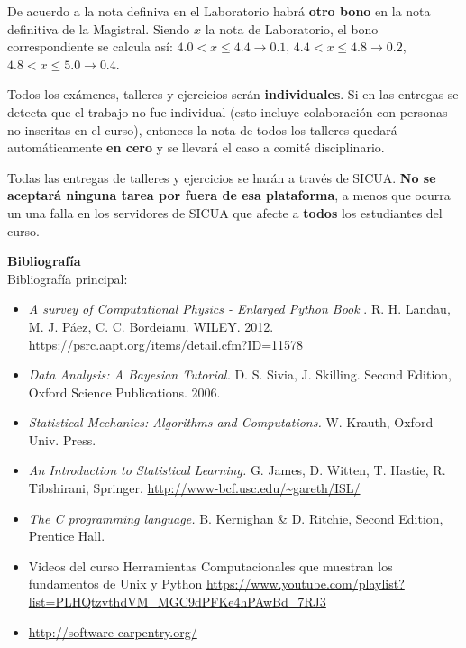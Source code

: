 \documentclass[letterpaper,10pt,onecolumn]{article}
\begin{document}
De acuerdo a la nota definiva en el Laboratorio habr\'a {\bf otro bono} en la
nota definitiva de la Magistral. 
Siendo $x$ la nota de Laboratorio, el bono correspondiente
se calcula as\'i:
$4.0 < x \leq 4.4 \rightarrow 0.1$, $4.4< x\leq 4.8\rightarrow 0.2$, $4.8<x
\leq 5.0\rightarrow 0.4$.

Todos los ex\'amenes, talleres y ejercicios ser\'an
\textbf{individuales}.  
Si en las entregas se detecta que el trabajo no fue
individual (esto incluye colaboraci\'on con personas no inscritas en
el curso), entonces la nota de todos los talleres quedar\'a
autom\'aticamente {\bf en cero} y se llevar\'a el caso a comit\'e
disciplinario. 

Todas las entregas de talleres y ejercicios se har\'an a trav\'es de
SICUA.  {\bf No se aceptar\'a ninguna tarea por fuera de esa
  plataforma}, a menos que ocurra un una falla en los servidores de
SICUA que afecte a {\bf todos} los estudiantes del curso.



\noindent\textbf{\large {} \quad
  Bibliograf\'ia}\\[-0.2cm] 



\noindent\normalsize Bibliograf\'ia principal:

\begin{itemize}
\item
\textit{A survey of Computational Physics - Enlarged Python Book}
. R. H. Landau, M. J. P\'aez, C. C. Bordeianu. WILEY. 2012.
\url{https://psrc.aapt.org/items/detail.cfm?ID=11578}

\item
\textit{Data Analysis: A Bayesian Tutorial.} D. S. Sivia,
J. Skilling. Second Edition, Oxford Science Publications. 2006.

\item 
\textit{Statistical Mechanics: Algorithms and Computations.}
W. Krauth, Oxford Univ. Press. 

\item
\textit{An Introduction to Statistical Learning.} G. James, D. Witten,
T. Hastie, R. Tibshirani,
Springer. \url{http://www-bcf.usc.edu/~gareth/ISL/} 

\item
\textit{The C programming language.}
 B. Kernighan \& D. Ritchie, Second Edition, Prentice Hall.

\item Videos del curso Herramientas Computacionales que muestran los
  fundamentos de Unix y Python \url{https://www.youtube.com/playlist?list=PLHQtzvthdVM_MGC9dPFKe4hPAwBd_7RJ3}

\item\url{http://software-carpentry.org/}
\end{itemize}
\end{document}
